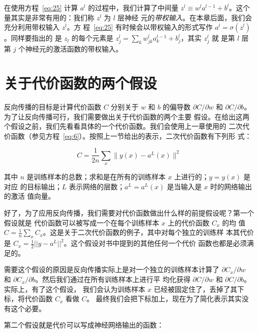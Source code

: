 在使用方程~\eqref{eq:25} 计算 $a^l$ 的过程中，我们计算了中间量
$z^l \equiv w^l a^{l-1}+b^l$。这个量其实是非常有用的：我们称 $z^l$ 为 $l$ 层神经
元的\emph{带权输入}。在本章后面，我们会充分利用带权输入 $z^l$。方
程~\eqref{eq:25} 有时候会以带权输入的形式写作 $a^l = \sigma(z^l)$。同样要指出的
是 $z_l$ 的每个元素是 $z^l_j = \sum_k w^l_{jk} a^{l-1}_k+b^l_j$，其实 $z^l_j$ 就
是第 $l$ 层第 $j$ 个神经元的激活函数的带权输入。

\section{关于代价函数的两个假设}
\label{sec:TwoAssumptionsWeNeedAboutTheCostFunction}

反向传播的目标是计算代价函数 $C$ 分别关于 $w$ 和 $b$ 的偏导数 $\partial
C/\partial w$ 和
$\partial C / \partial b$。为了让反向传播可行，我们需要做出关于代价函数的两个主要
假设。在给出这两个假设之前，我们先看看具体的一个代价函数。我们会使用上一章使用的
二次代价函数（参见方程~\eqref{eq:6}）。按照上一节给出的表示，二次代价函数有下列形
式：

\begin{equation}
  C = \frac{1}{2n} \sum_x \|y(x)-a^L(x)\|^2
  \label{eq:26}\tag{26}
\end{equation}

其中 $n$ 是训练样本的总数；求和是在所有的训练样本 $x$ 上进行的；$y = y(x)$ 是对应
的目标输出；$L$ 表示网络的层数；$a^L = a^L(x)$ 是当输入是 $x$ 时的网络输出的激活
值向量。

好了，为了应用反向传播，我们需要对代价函数做出什么样的前提假设呢？第一个假设就是
代价函数可以被写成一个在每个训练样本 $x$ 上的代价函数 $C_x$ 的均
值 $C=\frac{1}{n} \sum_x C_x$。这是关于二次代价函数的例子，其中对每个独立的训练样
本其代价是 $C_x = \frac{1}{2} ||y-a^L||^2$。这个假设对书中提到的其他任何一个代价
函数也都是必须满足的。

需要这个假设的原因是反向传播实际上是对一个独立的训练样本计算了 $\partial
C_x/\partial w$ 和 $\partial C_x/\partial b$。然后我们通过在所有训练样本上进行平
均化获得 $\partial C/\partial w$ 和 $\partial C/\partial b$。实际上，有了这个假设，
我们会认为训练样本 $x$ 已经被固定住了，丢掉了其下标，将代价函数 $C_x$ 看做 $C$。
最终我们会把下标加上，现在为了简化表示其实没有这个必要。

第二个假设就是代价可以写成神经网络输出的函数：

